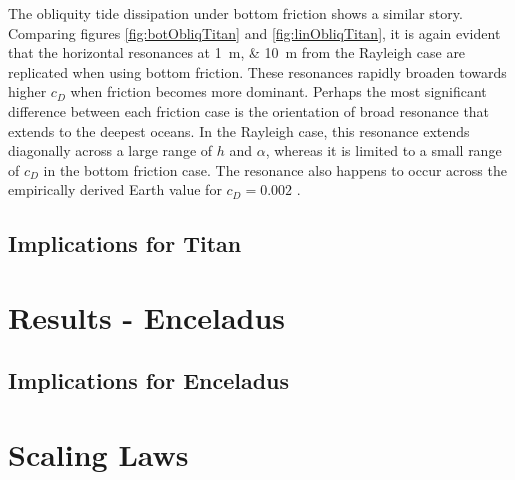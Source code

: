 The obliquity tide dissipation under bottom friction shows a similar story. Comparing figures \ref{fig:botObliqTitan} and \ref{fig:linObliqTitan}, it is again evident that the horizontal resonances at \SIlist{1;10}{\metre} from the Rayleigh case are replicated when using bottom friction. These resonances rapidly broaden towards higher $c_D$ when friction becomes more dominant. Perhaps the most significant difference between each friction case is the orientation of broad resonance that extends to the deepest oceans. In the Rayleigh case, this resonance extends diagonally across a large range of $h$ and $\alpha$, whereas it is limited to a small range of $c_D$ in the bottom friction case. The resonance also happens to occur across the empirically derived Earth value for $c_D = 0.002$ \citep[e.g.,][]{sohl1995tidal,egbert2001estimates}.

\subsection{Implications for Titan}

\section{Results - Enceladus \label{sec:results_Enceladus}}

\subsection{Implications for Enceladus}

\section{Scaling Laws \label{subsec:scaling}}